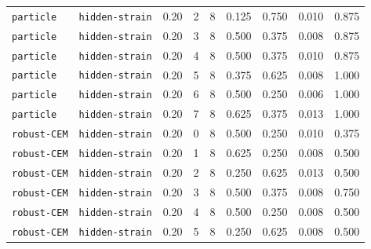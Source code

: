 \documentclass{article}
\begin{document}
\begin{center}
\begin{tabular}{llccccccc}
\texttt{particle} & \texttt{hidden-strain} & 0.20 & 2 & 8 & 0.125 & 0.750 & 0.010 & 0.875 \\
\texttt{particle} & \texttt{hidden-strain} & 0.20 & 3 & 8 & 0.500 & 0.375 & 0.008 & 0.875 \\
\texttt{particle} & \texttt{hidden-strain} & 0.20 & 4 & 8 & 0.500 & 0.375 & 0.010 & 0.875 \\
\texttt{particle} & \texttt{hidden-strain} & 0.20 & 5 & 8 & 0.375 & 0.625 & 0.008 & 1.000 \\
\texttt{particle} & \texttt{hidden-strain} & 0.20 & 6 & 8 & 0.500 & 0.250 & 0.006 & 1.000 \\
\texttt{particle} & \texttt{hidden-strain} & 0.20 & 7 & 8 & 0.625 & 0.375 & 0.013 & 1.000 \\
\texttt{robust-CEM} & \texttt{hidden-strain} & 0.20 & 0 & 8 & 0.500 & 0.250 & 0.010 & 0.375 \\
\texttt{robust-CEM} & \texttt{hidden-strain} & 0.20 & 1 & 8 & 0.625 & 0.250 & 0.008 & 0.500 \\
\texttt{robust-CEM} & \texttt{hidden-strain} & 0.20 & 2 & 8 & 0.250 & 0.625 & 0.013 & 0.500 \\
\texttt{robust-CEM} & \texttt{hidden-strain} & 0.20 & 3 & 8 & 0.500 & 0.375 & 0.008 & 0.750 \\
\texttt{robust-CEM} & \texttt{hidden-strain} & 0.20 & 4 & 8 & 0.500 & 0.250 & 0.008 & 0.500 \\
\texttt{robust-CEM} & \texttt{hidden-strain} & 0.20 & 5 & 8 & 0.250 & 0.625 & 0.008 & 0.500 \\
\bottomrule
\end{tabular}
\end{center}
\end{document}
